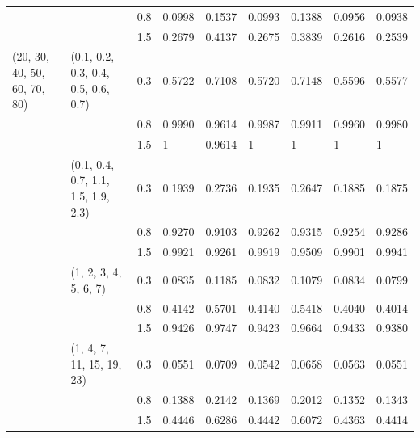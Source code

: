 \begin{table}[h]
\begin{tabular}{lllllllll}
                             			&                                     			& 0.8   	& 0.0998 	& 0.1537 	& 0.0993 	& 0.1388 	& 0.0956 	& 0.0938 \\
                             			&                                     			& 1.5   	& 0.2679 	& 0.4137 	& 0.2675 	& 0.3839 	& 0.2616 	& 0.2539 \\\hline
(20, 30, 40, 50, 60, 70, 80) 	& (0.1, 0.2, 0.3, 0.4, 0.5, 0.6, 0.7) 	& 0.3   	& 0.5722 	& 0.7108 	& 0.5720 	& 0.7148 	& 0.5596 	& 0.5577 \\
                             			&                                     			& 0.8   	& 0.9990 	& 0.9614 	& 0.9987 	& 0.9911 	& 0.9960 	& 0.9980 \\
                             			&                                     			& 1.5   	& 1	 	& 0.9614 	& 1	 	& 1	 	& 1	 	& 1	       \\
                             			& (0.1, 0.4, 0.7, 1.1, 1.5, 1.9, 2.3) 	& 0.3   	& 0.1939 	& 0.2736 	& 0.1935 	& 0.2647 	& 0.1885 	& 0.1875 \\
                             			&                                     			& 0.8   	& 0.9270 	& 0.9103 	& 0.9262 	& 0.9315 	& 0.9254 	& 0.9286 \\
                             			&                                     			& 1.5   	& 0.9921 	& 0.9261 	& 0.9919 	& 0.9509 	& 0.9901 	& 0.9941 \\
                             			& (1, 2, 3, 4, 5, 6, 7)               		& 0.3   	& 0.0835 	& 0.1185 	& 0.0832 	& 0.1079 	& 0.0834 	& 0.0799 \\
                          				&                                     			& 0.8   	& 0.4142 	& 0.5701 	& 0.4140 	& 0.5418 	& 0.4040 	& 0.4014 \\
                             			&                                     			& 1.5   	& 0.9426 	& 0.9747 	& 0.9423 	& 0.9664 	& 0.9433 	& 0.9380 \\
                             			& (1, 4, 7, 11, 15, 19, 23)           		& 0.3   	& 0.0551 	& 0.0709 	& 0.0542 	& 0.0658 	& 0.0563 	& 0.0551 \\
                             			&                                     			& 0.8   	& 0.1388 	& 0.2142 	& 0.1369 	& 0.2012 	& 0.1352 	& 0.1343 \\
                             			&                                     			& 1.5   	& 0.4446 	& 0.6286 	& 0.4442 	& 0.6072 	& 0.4363 	& 0.4414\\\toprule
\end{tabular}
\label{tab3}
\end{table}



